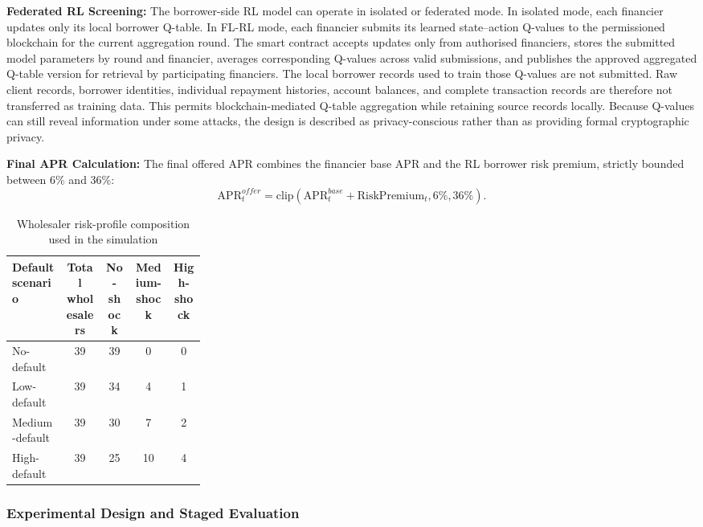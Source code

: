 \documentclass[12pt]{article}
\begin{document}
	\textbf{Federated RL Screening:} The borrower-side RL model can operate in isolated or federated mode. In isolated mode, each financier updates only its local borrower Q-table. In FL-RL mode, each financier submits its learned state--action Q-values to the permissioned blockchain for the current aggregation round. The smart contract accepts updates only from authorised financiers, stores the submitted model parameters by round and financier, averages corresponding Q-values across valid submissions, and publishes the approved aggregated Q-table version for retrieval by participating financiers. The local borrower records used to train those Q-values are not submitted. Raw client records, borrower identities, individual repayment histories, account balances, and complete transaction records are therefore not transferred as training data. This permits blockchain-mediated Q-table aggregation while retaining source records locally. Because Q-values can still reveal information under some attacks, the design is described as privacy-conscious rather than as providing formal cryptographic privacy.

	\textbf{Final APR Calculation:} The final offered APR combines the financier base APR and the RL borrower risk premium, strictly bounded between 6\% and 36\%:
	\[
	\mathrm{APR}^{offer}_t
	= \mathrm{clip}
	\left(
	\mathrm{APR}^{base}_t + \mathrm{RiskPremium}_t,
	6\%,
	36\%
	\right).
	\]
	
	\begin{table}[h]
		\centering
		\caption{Wholesaler risk-profile composition used in the simulation}
		\label{tab:wholesaler-risk-profile-composition}
		\begin{tabular}{|C{0.28\linewidth}|c|c|c|c|}
			\hline
			\textbf{Default scenario} & \textbf{Total wholesalers} & \textbf{No-shock} & \textbf{Medium-shock} & \textbf{High-shock} \\
			\hline
			No-default & 39 & 39 & 0 & 0 \\
			\hline
			Low-default & 39 & 34 & 4 & 1 \\
			\hline
			Medium-default & 39 & 30 & 7 & 2 \\
			\hline
			High-default & 39 & 25 & 10 & 4 \\
			\hline
		\end{tabular}
	\end{table}
	
	\subsubsection{Experimental Design and Staged Evaluation}
	
\end{document}
